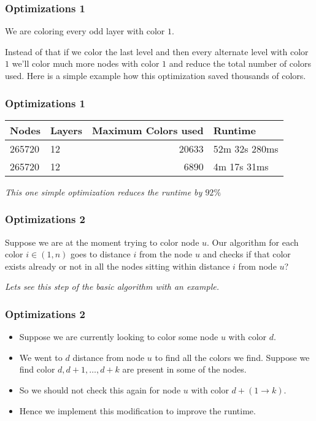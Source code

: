 \begin{frame}
    \frametitle{Optimizations 1}

    We are coloring every odd layer with color $1$. \pause[] 
    
    Instead of that if we color the last level and then every alternate level with color $1$ we'll color much more nodes with color $1$ and reduce the total number of colors used. Here is a simple example how this optimization saved thousands of colors.

\end{frame}

\begin{frame}
    \frametitle{Optimizations 1}

    \begin{table}[h]
        \centering
    \begin{tabular}{|l|l|r|l|}
    \hline
    \multicolumn{1}{|l|}{Nodes} & \multicolumn{1}{l|}{Layers} & \multicolumn{1}{l|}{Maximum Colors used} & \multicolumn{1}{l|}{Runtime} \\ \hline
    265720 & 12 & 20633 & 52m 32s 280ms \\ \hline
    265720 & 12 & 6890 & 4m 17s 31ms \\ \hline
    \end{tabular}
    \end{table}

    \pause
    \textit{This one simple optimization reduces the runtime by $92\%$}

\end{frame}



\begin{frame}
    \frametitle{Optimizations 2}

    Suppose we are at the moment trying to color node $u$. Our algorithm for each color $i \in (1, n)$ goes to distance $i$ from the node $u$ and checks if that color exists already or not in all the nodes sitting within distance $i$ from node $u$?

    \pause[]

    \textit{Lets see this step of the basic algorithm with an example.}

\end{frame}

\begin{frame}
    \frametitle{Optimizations 2}

    
    \begin{itemize}
        \item Suppose we are currently looking to color some node $u$ with color $d$.\pause[]
        \item We went to $d$ distance from node $u$ to find all the colors we find. Suppose we find color $d, d + 1, \dots, d+k$ are present in some of the nodes.\pause[]
        \item So we should not check this again for node $u$ with color $d + (1 \to k)$.\pause[]
        \item Hence we implement this modification to improve the runtime.
    \end{itemize}
\end{frame}


